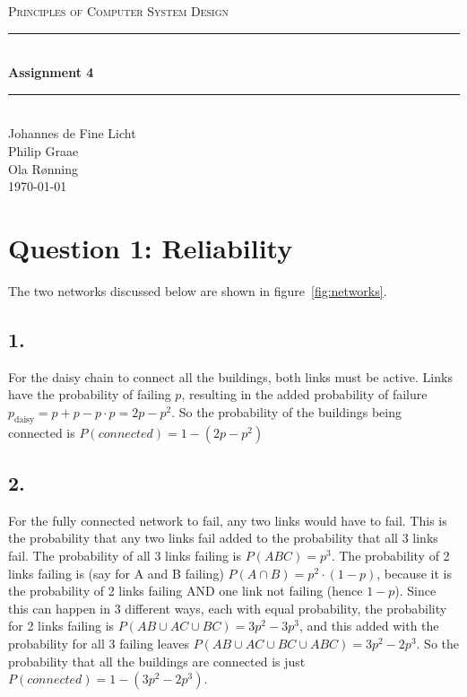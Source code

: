 \documentclass[12pt]{article}
\newcommand{\HRule}{\rule{\linewidth}{0.5mm}}
\begin{document}
\begin{center}
\textsc{\LARGE Principles of Computer System Design}\\[0.3cm] %
\HRule \\[0.4cm]
{ \huge \bfseries Assignment 4}
\HRule \\[0.4cm]
\large
Johannes de Fine Licht
\\Philip Graae
\\Ola Rønning
\\\today
\end{center}

\section*{Question 1: Reliability}

The two networks discussed below are shown in figure~\ref{fig:networks}.

\subsection*{1.}

For the daisy chain to connect all the buildings, both links must be active. Links have the probability of failing $p$, resulting in the added probability of failure $p_\text{daisy} = p + p - p\cdot p = 2p - p^2$. So the probability of the buildings being connected is $P(connected) = 1 - (2p - p^2)$

\subsection*{2.}


For the fully connected network to fail, any two links would have to fail. This is the probability that any two links fail added to the probability that all 3 links fail. The probability of all 3 links failing is $P(ABC) = p^{3}$. The probability of 2 links failing is (say for A and B failing) $P(A\cap B) = p^{2}\cdot(1-p)$, because it is the probability of 2 links failing AND one link not failing (hence $1-p$). Since this can happen in 3 different ways, each with equal probability, the probability for 2 links failing is $P(AB \cup AC \cup BC) = 3p^2 - 3p^3$, and this added with the probability for all 3 failing leaves $P(AB \cup AC \cup BC \cup ABC) = 3p^2 - 2p^3$. So the probability that all the buildings are connected is just $P(connected) = 1 - (3p^2 - 2p^3)$.
\end{document}
